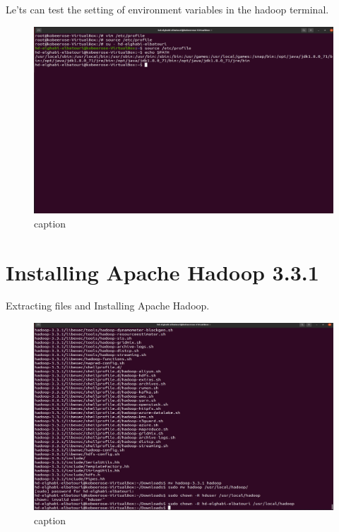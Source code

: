 \begin{spacing}{1.2}
\par Le'ts can test the setting of environment variables in the hadoop terminal.
\\
\begin{figure}[!htb] 
\begin{center} 
\includegraphics[width=1\linewidth]{Big_Data/Hadoop/Apache Hadoop Installation/Verifying PATH.jpg} 
\end{center} 
\caption{caption} 
\end{figure} 
\FloatBarrier

\section{Installing Apache Hadoop 3.3.1}

\par Extracting files and Installing Apache Hadoop.
\\
\begin{figure}[!htb] 
\begin{center} 
\includegraphics[width=1\linewidth]{Big_Data/Hadoop/Apache Hadoop Installation/Extracting Hadoop.jpg}
\end{center} 
\caption{caption} 
\end{figure} 
\FloatBarrier



\end{spacing}
